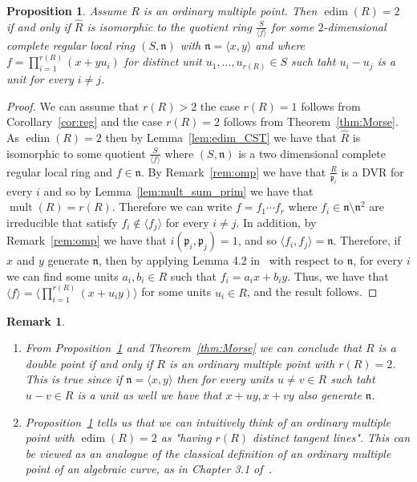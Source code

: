 \documentclass{article}
\newtheorem{proposition}[theorem]{Proposition}
\newtheorem{remark}[theorem]{Remark}
\DeclareMathOperator{\chara}{char}
\DeclareMathOperator{\edim}{edim}
\DeclareMathOperator{\mult}{mult}
\numberwithin{theorem}{section}
\begin{document}
\begin{proposition}\label{prop:omp_edim2}
    Assume $R$ is an ordinary multiple point. Then $\edim(R)=2$ if and only if $\hat{R}$ is isomorphic to the quotient ring $\frac{S}{\langle f\rangle}$ for some $2$-dimensional complete regular local ring $(S, \mathfrak{n})$ with $\mathfrak{n} = \langle x,y \rangle$ and where $f=\prod_{i=1}^{r(R)} (x+yu_i)$ for distinct unit $u_1, \dots, u_{r(R)} \in S$ such taht $u_i-u_j$ is a unit for every $i \neq j$.  
\end{proposition}


\begin{proof}
   We can assume that $r(R) > 2$ the case $r(R)=1$ follows from Corollary~\ref{cor:reg} and the case $r(R)=2$ follows from Theorem~\ref{thm:Morse}. As $\edim(R)=2$ then by Lemma~\ref{lem:edim_CST} we have that $\hat{R}$ is isomorphic to some quotient $\frac{S}{\langle f \rangle}$ where $(S,\mathfrak{n})$ is a two dimensional complete regular local ring and $f \in \mathfrak{n}$. By Remark~\ref{rem:omp} we have that $\frac{R}{\mathfrak{p}_i}$ is a DVR for every $i$ and so by Lemma~\ref{lem:mult_sum_prim} we have that $\mult(R)=r(R)$. Therefore we can write $f=f_1 \cdots f_r$ where $f_i \in \mathfrak{n} \setminus\mathfrak{n}^2$ are irreducible that satisfy $f_i \notin \langle f_j \rangle$ for every $i \neq j$. In addition, by Remark~\ref{rem:omp} we have that $i(\mathfrak{p}_i, \mathfrak{p}_j)=1$, and so $\langle f_i, f_j \rangle = \mathfrak{n}$. Therefore, if $x$ and $y$ generate $\mathfrak{n}$, then by applying Lemma 4.2 in~\cite{greuel2019finite} with respect to $\mathfrak{n}$, for every $i$ we can find some units $a_i, b_i \in R$ such that $f_i = a_i x+b_iy$. Thus, we have that $\langle f \rangle = \langle \prod_{i=1}^{r(R)} (x+u_i y) \rangle$ for some units $u_i \in R$, and the result follows. 
\end{proof}


\begin{remark}
\begin{enumerate}
    \item \textup{From Proposition~\ref{prop:omp_edim2} and Theorem~\ref{thm:Morse} we can conclude that $R$ is a double point if and only if $R$ is an ordinary multiple point with $r(R)=2$. This is true since if $\mathfrak{n}=\langle x,y \rangle$ then for every units $u \neq  v \in R$ such taht $u-v \in R$ is a unit as well we have that $x+uy, x+vy$ also generate $\mathfrak{n}$.  }
    \item \textup{Proposition~\ref{prop:omp_edim2} tells us that we can intuitively think of an ordinary multiple point with $\edim(R)=2$ as "having $r(R)$ distinct tangent lines". This can be viewed as an analogue of the classical definition of an ordinary multiple point of an algebraic curve, as in Chapter 3.1 of~\cite{fulton2013intersection}.}
\end{enumerate}
\end{remark}
\end{document}
